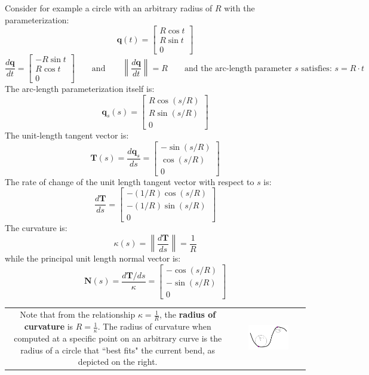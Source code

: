 \documentclass{article}
\begin{document}
Consider for example a circle with an arbitrary radius of \(R\) with the parameterization:
\[\mathbf{q}(t) = \begin{bmatrix} R \cos t \\ R \sin t \\ 0 \end{bmatrix}\]  
\[\frac{d\mathbf{q}}{dt} = \begin{bmatrix} -R \sin t \\ R \cos t \\ 0 \end{bmatrix} \quad\quad\text{and}\quad\quad \left\|\frac{d\mathbf{q}}{dt}\right\| = R \quad\quad\text{and the arc-length parameter \(s\) satisfies: } s = R \cdot t\]
The arc-length parameterization itself is: 
\[\mathbf{q}_s(s) = \begin{bmatrix} R \cos(s/R) \\ R \sin(s/R) \\ 0 \end{bmatrix}\]
The unit-length tangent vector is:
\[\mathbf{T}(s) = \frac{d\mathbf{q}_s}{ds} = \begin{bmatrix} -\sin(s/R) \\ \cos(s/R) \\ 0 \end{bmatrix}\]
The rate of change of the unit length tangent vector with respect to \(s\) is:
\[\frac{d\mathbf{T}}{ds} = \begin{bmatrix} -(1/R)\cos(s/R) \\ -(1/R)\sin(s/R) \\ 0 \end{bmatrix}\]
The curvature is:
\[\kappa(s) = \left\|\frac{d\mathbf{T}}{ds}\right\| = \frac{1}{R}\]
while the principal unit length normal vector is:
\[\mathbf{N}(s) = \frac{d\mathbf{T}/ds}{\kappa} = \begin{bmatrix} -\cos(s/R) \\ -\sin(s/R) \\ 0 \end{bmatrix}\]
\begin{tabular}{cc}
\parbox{0.4\textwidth}{
Note that from the relationship \(\kappa = \frac{1}{R}\), the {\bf radius of curvature} is \(R = \frac{1}{\kappa}\). The radius of curvature when computed at a specific point on an arbitrary curve is the radius of a circle that ``best fits" the current bend, as depicted on the right. 
} & \parbox{0.6\textwidth}{
\includegraphics[width = 0.6\textwidth]{radius_of_curvature}
}
\end{tabular}
\end{document}
